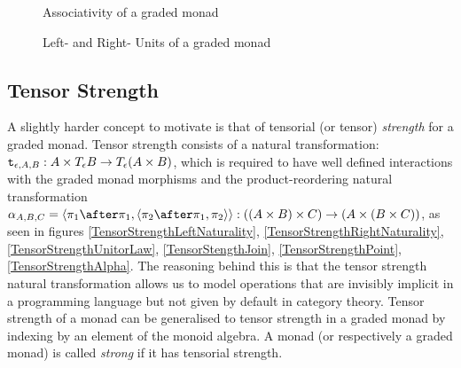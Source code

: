 \documentclass{Report}
\begin{document}
\begin{figure}
\begin{framed}
        \centering
        \begin{minipage}{0.45\textwidth}
            \centering
            \caption{Associativity of a graded monad}
            \label{GradedMonadAssociativity}
        \end{minipage}\hfill
        \begin{minipage}{0.45\textwidth}
            \centering
            \caption{Left- and Right- Units of a graded monad}
            \label{GradedMonadUnits}
        \end{minipage}
\end{framed}
\end{figure}


\subsection{Tensor Strength}
A slightly harder concept to motivate is that of tensorial (or tensor) \textit{strength} for a graded monad. Tensor strength consists of a natural transformation: $\texttt{t}_{\epsilon, A, B}: A \times T_{\epsilon}{B} \rightarrow T_{\epsilon}{(A \times B)}$, which is required to have well defined interactions with the graded monad morphisms and the product-reordering natural transformation $\alpha_{A, B, C} = \pr{\p\after\p}{\pr{\pp\after\p}{\pp}}: ((A \times B) \times C) \rightarrow (A \times (B \times C))$, as seen in figures \ref{TensorStrengthLeftNaturality}, \ref{TensorStrengthRightNaturality}, \ref{TensorStrengthUnitorLaw}, \ref{TensorStengthJoin}, \ref{TensorStrengthPoint}, \ref{TensorStrengthAlpha}. The reasoning behind this is that the tensor strength natural transformation allows us to model operations that are invisibly implicit in a programming language but not given by default in category theory. Tensor strength of a monad can be generalised to tensor strength in a graded monad by indexing by an element of the monoid algebra. A monad (or respectively a graded monad) is called \textit{strong} if it has tensorial strength. 
\end{document}
